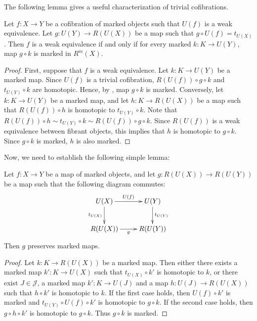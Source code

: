 \documentclass[reqno]{amsart}
\theoremstyle{definition}
\theoremstyle{remark}
\numberwithin{figure}{section}
\begin{document}
The following lemma gives a useful characterization of trivial cofibrations.

\begin{lem}
Let $f : X \to Y$ be a cofibration of marked objects such that $U(f)$ is a weak equivalence.
Let $g : U(Y) \to R(U(X))$ be a map such that $g \circ U(f) = t_{U(X)}$.
Then $f$ is a weak equivalence if and only if for every marked $k : K \to U(Y)$, map $g \circ k$ is marked in $R^m(X)$.
\end{lem}
\begin{proof}
First, suppose that $f$ is a weak equivalence.
Let $k : K \to U(Y)$ be a marked map.
Since $U(f)$ is a trivial cofibration, $R(U(f)) \circ g \circ k$ and $t_{U(Y)} \circ k$ are homotopic.
Hence, by , map $g \circ k$ is marked.
Conversely, let $k : K \to U(Y)$ be a marked map, and let $h : K \to R(U(X))$ be a map such that $R(U(f)) \circ h$ is homotopic to $t_{U(Y)} \circ k$.
Note that $R(U(f)) \circ h \sim t_{U(Y)} \circ k \sim R(U(f)) \circ g \circ k$.
Since $R(U(f))$ is a weak equivalence between fibrant objects, this implies that $h$ is homotopic to $g \circ k$.
Since $g \circ k$ is marked, $h$ is also marked.
\end{proof}

Now, we need to establish the following simple lemma:

\begin{lem}
Let $f : X \to Y$ be a map of marked objects, and let $g : R(U(X)) \to R(U(Y))$ be a map such that the following diagram commutes:
\[ \xymatrix{ U(X) \ar[r]^{U(f)} \ar[d]_{t_{U(X)}} & U(Y) \ar[d]^{t_{U(Y)}} \\
              R(U(X)) \ar[r]_g & R(U(Y))
            } \]
Then $g$ preserves marked maps.
\end{lem}
\begin{proof}
Let $k : K \to R(U(X))$ be a marked map.
Then either there exists a marked map $k' : K \to U(X)$ such that $t_{U(X)} \circ k'$ is homotopic to $k$,
or there exist $J \in \mathcal{J}$, a marked map $k' : K \to U(J)$ and a map $h : U(J) \to R(U(X))$ such that $h \circ k'$ is homotopic to $k$.
If the first case holds, then $U(f) \circ k'$ is marked and $t_{U(Y)} \circ U(f) \circ k'$ is homotopic to $g \circ k$.
If the second case holds, then $g \circ h \circ k'$ is homotopic to $g \circ k$.
Thus $g \circ k$ is marked.
\end{proof}
\end{document}
